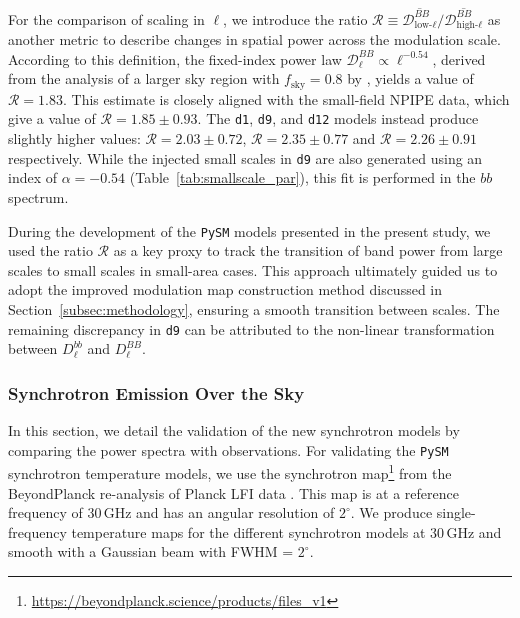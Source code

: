 \documentclass[twocolumn]{aastex631}
\begin{document}
For the comparison of scaling in $\ell$, we introduce the ratio $\mathcal{R} \equiv \overline{\mathcal{D}_{\text{low-}\ell}^{BB}} \Big/ \overline{\mathcal{D}_{\text{high-}\ell}^{BB}}$ as another metric to describe changes in spatial power across the modulation scale. According to this definition, the fixed-index power law $\mathcal{D}_\ell^{BB} \propto \ell^{-0.54}$, derived from the analysis of a larger sky region with $f_\text{sky} = 0.8$ by \cite{planck2016-l11A}, yields a value of $\mathcal{R} = 1.83$. This estimate is closely aligned with the small-field NPIPE data, which give a value of $\mathcal{R} = 1.85 \pm 0.93$. The \texttt{d1}, \texttt{d9}, and \texttt{d12} models instead produce slightly higher values: $\mathcal{R} = 2.03 \pm 0.72$, $\mathcal{R} = 2.35 \pm 0.77$ and $\mathcal{R} = 2.26 \pm 0.91$ respectively. While the injected small scales in \texttt{d9} are also generated using an index of $\alpha = -0.54$ (Table~\ref{tab:smallscale_par}), this fit is performed in the $bb$ spectrum. 

During the development of the \texttt{PySM} models presented in the present study, we used the ratio $\mathcal{R}$ as a key proxy to track the transition of band power from large scales to small scales in small-area cases. This approach ultimately guided us to adopt the improved modulation map construction method discussed in Section~\ref{subsec:methodology}, ensuring a smooth transition between scales. The remaining discrepancy in \texttt{d9} can be attributed to the non-linear transformation between $D_\ell^{bb}$ and $D_\ell^{BB}$.

\subsubsection{Synchrotron Emission Over the Sky} \label{sec:sync_validation}

In this section, we detail the validation of the new synchrotron models by comparing the power spectra with observations. For validating the \texttt{PySM} synchrotron temperature models, we use the synchrotron map\footnote{\url{https://beyondplanck.science/products/files\_v1}} from the BeyondPlanck re-analysis of Planck LFI data \citep{Andersen:2023}. This map is at a reference frequency of 30\,GHz and has an angular resolution of $2^\circ$. We produce single-frequency temperature maps for the different synchrotron models at 30\,GHz and smooth with a Gaussian beam with FWHM = $2^\circ$.
\end{document}
